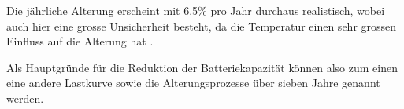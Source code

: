 Die jährliche Alterung erscheint mit 6.5\% pro Jahr durchaus realistisch, wobei auch hier eine grosse Unsicherheit besteht, da die Temperatur einen sehr grossen Einfluss auf die Alterung hat \cite{bat_alterung}.

Als Hauptgründe für die Reduktion der Batteriekapazität können also zum einen eine andere Lastkurve sowie die Alterungsprozesse über sieben Jahre genannt werden.



\color{black}\newpage